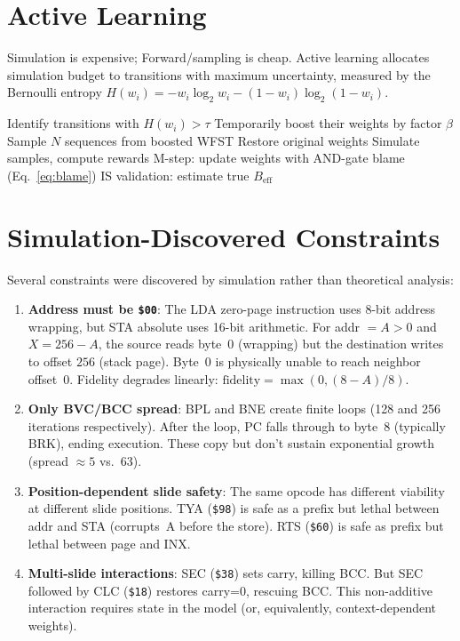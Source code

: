 \documentclass{article}
\newcommand{\hex}[1]{\texttt{\$#1}}
\newcommand{\Beff}{B_{\mathrm{eff}}}
\begin{document}
\section{Active Learning}

Simulation is expensive; Forward/sampling is cheap. Active learning
allocates simulation budget to transitions with maximum uncertainty,
measured by the Bernoulli entropy $H(w_i) = -w_i \log_2 w_i -
(1-w_i) \log_2(1-w_i)$.

\begin{algorithm}
\caption{Active Learning Iteration}
\begin{algorithmic}[1]
\State Identify transitions with $H(w_i) > \tau$
\State Temporarily boost their weights by factor $\beta$
\State Sample $N$ sequences from boosted WFST
\State Restore original weights
\State Simulate samples, compute rewards
\State M-step: update weights with AND-gate blame (Eq.~\ref{eq:blame})
\State IS validation: estimate true $\Beff$
\end{algorithmic}
\end{algorithm}

\section{Simulation-Discovered Constraints}

Several constraints were discovered by simulation rather than
theoretical analysis:

\begin{enumerate}
\item \textbf{Address must be \hex{00}}: The LDA zero-page instruction
  uses 8-bit address wrapping, but STA absolute uses 16-bit arithmetic.
  For addr $= A > 0$ and $X = 256 - A$, the source reads byte~0
  (wrapping) but the destination writes to offset $256$ (stack page).
  Byte~0 is physically unable to reach neighbor offset~0.
  Fidelity degrades linearly: $\text{fidelity} = \max(0, (8-A)/8)$.

\item \textbf{Only BVC/BCC spread}: BPL and BNE create finite loops
  (128 and 256 iterations respectively). After the loop, PC falls
  through to byte~8 (typically BRK), ending execution. These copy
  but don't sustain exponential growth (spread $\approx 5$ vs.\ 63).

\item \textbf{Position-dependent slide safety}: The same opcode has
  different viability at different slide positions. TYA (\hex{98})
  is safe as a prefix but lethal between addr and STA (corrupts~A
  before the store). RTS (\hex{60}) is safe as prefix but lethal
  between page and INX.

\item \textbf{Multi-slide interactions}: SEC (\hex{38}) sets carry,
  killing BCC. But SEC followed by CLC (\hex{18}) restores carry=0,
  rescuing BCC. This non-additive interaction requires state in
  the model (or, equivalently, context-dependent weights).
\end{enumerate}
\end{document}
